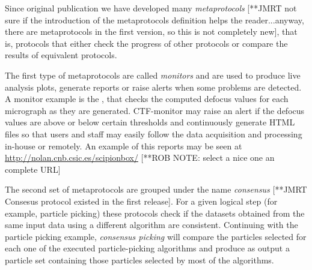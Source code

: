 
Since \scipion original publication we have developed many \emph{metaprotocols} [**JMRT not sure if the 
introduction of the metaprotocols definition helps the reader...anyway, there are metaprotocols in the first
version, so this is not completely new], that is, 
protocols that either check the progress of other protocols or compare the results of equivalent protocols.

The first type of metaprotocols are called \emph{monitors} and are used to produce live analysis plots, generate reports or raise alerts when some problems are detected. A monitor example is the , that checks the computed defocus values for
each micrograph as they are generated. CTF-monitor may raise an alert if the defocus values are above or below certain thresholds and continuously generate HTML files so that users and staff may easily follow the data acquisition and processing in-house or remotely. An example of this reports may be seen at \url{http://nolan.cnb.csic.es/scipionbox/} [**ROB NOTE: select a nice one an complete URL]%

The second set of metaprotocols are grouped under the name \emph{consensus} [**JMRT Consesus protocol existed in the first release]. For a given logical step (for example, particle picking) these protocols check if the datasets obtained from the same input data using a different algorithm are consistent. Continuing with the particle picking example, \emph{consensus picking} will compare the particles selected for each one of the executed particle-picking algorithms and produce as output a particle set containing those particles selected by most of the algorithms.

